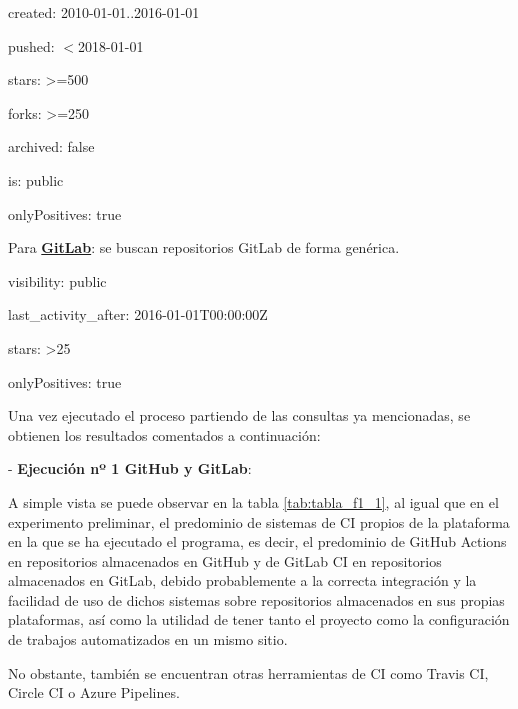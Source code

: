 \begin{compactitem}
\begin{compactitem}
\begin{compactitem}
            \item created: 2010-01-01..2016-01-01
            \item pushed: $<$2018-01-01
            \item stars: \textgreater=500
            \item forks: \textgreater=250
            \item archived: false
            \item is: public
            \item onlyPositives: true
        \end{compactitem}
    \end{compactitem}
    \item Para \textbf{\underline{GitLab}}: se buscan repositorios GitLab de forma genérica.
    \begin{compactitem}
        \item visibility: public
        \item last\_activity\_after: 2016-01-01T00:00:00Z
        \item stars: \textgreater25
        \item onlyPositives: true
    \end{compactitem}
\end{compactitem}

Una vez ejecutado el proceso partiendo de las consultas ya mencionadas, se obtienen los resultados comentados a continuación:

- \textbf{Ejecución nº 1 GitHub y GitLab}: 

A simple vista se puede observar en la tabla \ref{tab:tabla_f1_1}, al igual que en el experimento preliminar, el predominio de sistemas de CI propios de la plataforma en la que se ha ejecutado el programa, es decir, el predominio de GitHub Actions en repositorios almacenados en GitHub y de GitLab CI en repositorios almacenados en GitLab, debido probablemente a la correcta integración y la facilidad de uso de dichos sistemas sobre repositorios almacenados en sus propias plataformas, así como la utilidad de tener tanto el proyecto como la configuración de trabajos automatizados en un mismo sitio.

No obstante, también se encuentran otras herramientas de CI como Travis CI, Circle CI o Azure Pipelines.

